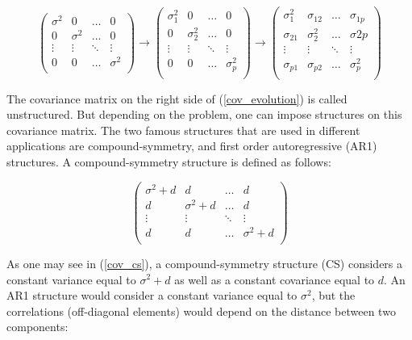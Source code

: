 \documentclass[11pt,a5paper,twoside]{book}
\begin{document}
\begin{equation}
\label{cov_evolution}
\left(
\begin{array}{cccc}
\sigma^2 & 0 & \ldots & 0 \\
0 & \sigma^2 & \ldots & 0  \\
\vdots & \vdots & \ddots & \vdots \\
0 & 0 & \ldots & \sigma^2 \\
\end{array} \right)\rightarrow \left(
\begin{array}{cccc}
\sigma_1^2 & 0 & \ldots & 0 \\
0 & \sigma_2^2 & \ldots & 0  \\
\vdots & \vdots & \ddots & \vdots \\
0 & 0 & \ldots & \sigma_p^2 \\
\end{array} \right)\rightarrow \left(
\begin{array}{cccc}
\sigma_1^2 & \sigma_{12} & \ldots & \sigma_{1p} \\
\sigma_{21} & \sigma_2^2 & \ldots & \sigma{2p}  \\
\vdots & \vdots & \ddots & \vdots \\
\sigma_{p1}& \sigma_{p2} & \ldots & \sigma_p^2 \\
\end{array} \right)
\end{equation}

The covariance matrix on the right side of (\ref{cov_evolution}) is called unstructured. But depending on the problem, one can impose structures on this covariance matrix. The two famous structures that are used in different applications are compound-symmetry, and first order autoregressive (AR1) structures. A compound-symmetry structure is defined as follows:

\begin{equation}
\label{cov_cs}
\left(
\begin{array}{cccc}
\sigma^2 + d & d & \ldots & d \\
d & \sigma^2 + d & \ldots & d  \\
\vdots & \vdots & \ddots & \vdots \\
d & d & \ldots & \sigma^2 + d \\
\end{array} \right)
\end{equation}

As one may see in (\ref{cov_cs}), a compound-symmetry structure (CS) considers a constant variance equal to $\sigma^2 + d$ as well as a constant covariance equal to $d$. An AR1 structure would consider a constant variance equal to $\sigma^2$, but the correlations (off-diagonal elements) would depend on the distance between two components:
\end{document}
